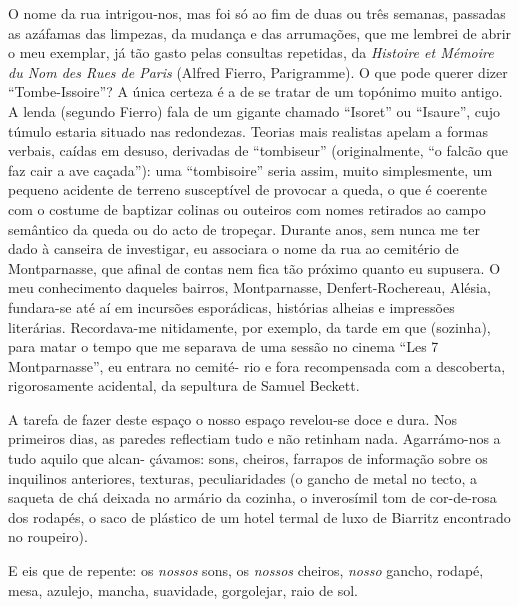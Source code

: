 O nome da rua intrigou-nos, mas foi só ao fim de duas ou três semanas,
passadas as azáfamas das limpezas, da mudança e das arrumações, que me
lembrei de abrir o meu exemplar, já tão gasto pelas consultas repetidas,
da \emph{Histoire et Mémoire du Nom des Rues de Paris }(Alfred Fierro,
Parigramme). O que pode querer dizer ``Tombe-Issoire''? A única certeza
é a de se tratar de um topónimo muito antigo. A lenda (segundo Fierro)
fala de um gigante chamado ``Isoret'' ou ``Isaure'', cujo túmulo estaria
situado nas redondezas. Teorias mais realistas apelam a formas
verbais, caídas em desuso, derivadas de ``tombiseur'' (originalmente,
``o falcão que faz cair a ave caçada''): uma ``tombisoire'' seria
assim, muito simplesmente, um pequeno acidente de terreno susceptível de
provocar a queda, o que é coerente com o costume de baptizar colinas ou
outeiros com nomes retirados ao campo semântico da queda ou do acto de
tropeçar. Durante anos, sem nunca me ter dado à canseira de investigar,
eu associara o nome da rua ao cemitério de Montparnasse, que afinal de
contas nem fica tão próximo quanto eu supusera. O meu conhecimento
daqueles bairros, Montparnasse, Denfert-Rochereau, Alésia, fundara-se
até aí em incursões esporádicas, histórias alheias e impressões literárias. Recordava-me nitidamente, por exemplo, da tarde em que
(sozinha), para matar o tempo que me separava de uma sessão no cinema
``Les 7 Montparnasse'', eu entrara no cemité- rio e fora recompensada
com a descoberta, rigorosamente acidental, da sepultura de Samuel
Beckett.

A tarefa de fazer deste espaço o nosso espaço revelou-se
doce e dura. Nos primeiros dias, as paredes reflectiam tudo e não
retinham nada. Agarrámo-nos a tudo aquilo que alcan- çávamos: sons,
cheiros, farrapos de informação sobre os inquilinos anteriores,
texturas, peculiaridades (o gancho de metal no tecto, a saqueta de chá
deixada no armário da cozinha, o inverosímil tom de cor-de-rosa dos
rodapés, o saco de plástico de um hotel termal de luxo de Biarritz
encontrado no roupeiro).

E eis que de repente: os \emph{nossos }sons, os
\emph{nossos }cheiros, \emph{nosso }gancho, rodapé, mesa, azulejo,
mancha, suavidade, gorgolejar, raio de sol.


